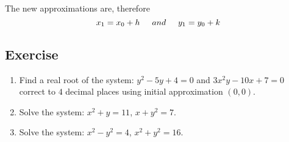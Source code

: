 \documentclass[aima203_lecturenotes_ku.tex]{subfiles}
\begin{document}
The new approximations are, therefore
\begin{equation}
  x_1 = x_0 +h \hspace{5mm} and \hspace{5mm} y_1 = y_0 + k
\end{equation}

\subsection{Exercise}
\begin{enumerate}
\item Find a real root of the system: $y^2-5y+4=0$ and $3x^2y-10x+7 = 0$ correct to $4$ decimal places using initial approximation $(0,0)$.

\item Solve the system: $x^2+y = 11$, $x+y^2 = 7$.

\item Solve the system: $x^2-y^2 = 4$, $x^2+y^2=16$.
\end{enumerate}
\end{document}
